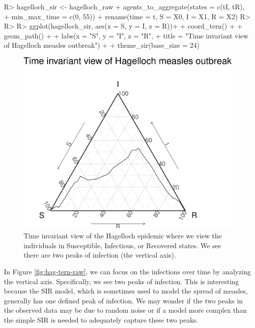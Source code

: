\documentclass[
  shortnames]{jss}
\begin{document}
\begin{CodeChunk}
\begin{CodeInput}
R> hagelloch_sir <- hagelloch_raw %
+   agents_to_aggregate(states = c(tI, tR),
+                       min_max_time = c(0, 55)) %
+   rename(time = t, S = X0, I = X1, R = X2)
R> 
R> 
R> ggplot(hagelloch_sir, aes(x = S, y = I, z = R))+
+   coord_tern() +
+   geom_path() +
+   labs(x = "S", y = "I", z = "R",
+        title = "Time invariant view of Hagelloch measles outbreak") + 
+   theme_sir(base_size = 24)
\end{CodeInput}
\begin{figure}[H]

{\centering \includegraphics{Figs/unnamed-chunk-4-1} 

}

\caption{\label{fig:hag-tern-raw}Time invariant view of the Hagelloch epidemic where we view the individuals in Susceptible, Infectious, or Recovered states.  We see there are two peaks of infection (the vertical axis).}\label{fig:unnamed-chunk-4}
\end{figure}
\end{CodeChunk}

In Figure \ref{fig:hag-tern-raw}, we can focus on the infections over
time by analyzing the vertical axis. Specifically, we see two peaks of
infection. This is interesting because the SIR model, which is sometimes
used to model the spread of measles, generally has one defined peak of
infection. We may wonder if the two peaks in the observed data may be
due to random noise or if a model more complex than the simple SIR is
needed to adequately capture these two peaks.
\end{document}
